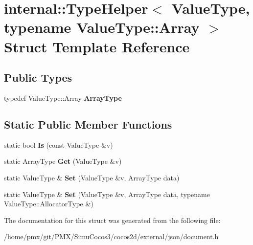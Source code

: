 \hypertarget{structinternal_1_1TypeHelper_3_01ValueType_00_01typename_01ValueType_1_1Array_01_4}{}\section{internal\+:\+:Type\+Helper$<$ Value\+Type, typename Value\+Type\+:\+:Array $>$ Struct Template Reference}
\label{structinternal_1_1TypeHelper_3_01ValueType_00_01typename_01ValueType_1_1Array_01_4}
\subsection*{Public Types}
\begin{DoxyCompactItemize}
\item 
\mbox{\label{structinternal_1_1TypeHelper_3_01ValueType_00_01typename_01ValueType_1_1Array_01_4_a8f384dc96b6104e85b956ec5f7386434}} 
typedef Value\+Type\+::\+Array {\bfseries Array\+Type}
\end{DoxyCompactItemize}
\subsection*{Static Public Member Functions}
\begin{DoxyCompactItemize}
\item 
\mbox{\label{structinternal_1_1TypeHelper_3_01ValueType_00_01typename_01ValueType_1_1Array_01_4_a2a052fc0139112075f8bade42964273d}} 
static bool {\bfseries Is} (const Value\+Type \&v)
\item 
\mbox{\label{structinternal_1_1TypeHelper_3_01ValueType_00_01typename_01ValueType_1_1Array_01_4_a0e6bd47ab5da0387bf419cdf644035ab}} 
static Array\+Type {\bfseries Get} (Value\+Type \&v)
\item 
\mbox{\label{structinternal_1_1TypeHelper_3_01ValueType_00_01typename_01ValueType_1_1Array_01_4_a7bab3fa93fb8bda16baf289e1d281315}} 
static Value\+Type \& {\bfseries Set} (Value\+Type \&v, Array\+Type data)
\item 
\mbox{\label{structinternal_1_1TypeHelper_3_01ValueType_00_01typename_01ValueType_1_1Array_01_4_adba46e8947dcfecaeca5a5a5d8bb36cc}} 
static Value\+Type \& {\bfseries Set} (Value\+Type \&v, Array\+Type data, typename Value\+Type\+::\+Allocator\+Type \&)
\end{DoxyCompactItemize}


The documentation for this struct was generated from the following file\+:\begin{DoxyCompactItemize}
\item 
/home/pmx/git/\+P\+M\+X/\+Simu\+Cocos3/cocos2d/external/json/document.\+h\end{DoxyCompactItemize}

